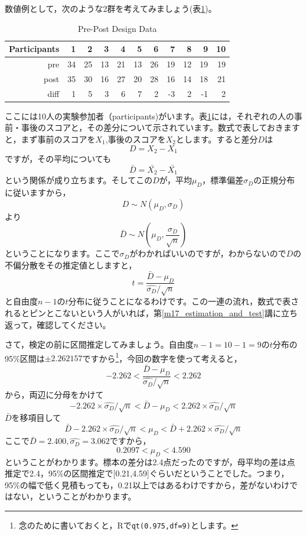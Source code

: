 \documentclass{ltjsbook}
\begin{document}
数値例として，次のような2群を考えてみましょう(表\ref{tbl19::01})。
\begin{table}[ht]
	\centering
	\caption{Pre-Post Design Data}
	\begin{tabular}{rrrrrrrrrrr}
		\hline
		Participants & 1  & 2  & 3  & 4  & 5  & 6  & 7  & 8  & 9  & 10 \\
		\hline
		pre          & 34 & 25 & 13 & 21 & 13 & 26 & 19 & 12 & 19 & 19 \\
		post         & 35 & 30 & 16 & 27 & 20 & 28 & 16 & 14 & 18 & 21 \\ \hline
		diff         & 1  & 5  & 3  & 6  & 7  & 2  & -3 & 2  & -1 & 2  \\
		\hline
	\end{tabular}
	\label{tbl19::01}
\end{table}
ここには10人の実験参加者（participants)がいます。表\ref{tbl19::01}には，それぞれの人の事前・事後のスコアと，その差分について示されています。数式で表しておきますと，まず事前のスコアを$X_1$,事後のスコアを$X_2$とします。すると差分$D$は
\[ D = X_2 - X_1 \]
ですが，その平均についても
\[ \bar{D} = \bar{X_2} - \bar{X_1} \]
という関係が成り立ちます。そしてこの$D$が，平均$\mu_D$，標準偏差$\sigma_D$の正規分布に従いますから，
\[ D \sim N(\mu_D,\sigma_D)\]
より
\[ \bar{D} \sim N(\mu_D,\frac{\sigma_D}{\sqrt{n}}) \]
ということになります。ここで$\sigma_D$がわかればいいのですが，わからないので$D$の不偏分散をその推定値としますと，
\[ t = \frac{\bar{D}-\mu_D}{\hat{\sigma_D}/\sqrt{n}} \]
と自由度$n-1$の$t$分布に従うことになるわけです。この一連の流れ，数式で表されるとピンとこないという人がいれば，第\ref{m17_estimation_and_test}講に立ち返って，確認してください。

さて，検定の前に区間推定してみましょう。自由度$n-1=10-1=9$の$t$分布の95\%区間は$\pm 2.262157$ですから\footnote{念のために書いておくと，Rで\texttt{qt(0.975,df=9)}とします。}，今回の数字を使って考えると，
\[ -2.262 < \frac{\bar{D}-\mu_D}{\hat{\sigma_D}/\sqrt{n}} < 2.262 \]
から，両辺に分母をかけて
\[ -2.262 \times \hat{\sigma_D}/\sqrt{n} < \bar{D}-\mu_D < 2.262 \times \hat{\sigma_D}/\sqrt{n} \]
$\bar{D}$を移項目して
\[ \bar{D}-2.262 \times \hat{\sigma_D}/\sqrt{n} < \mu_D < \bar{D}+2.262\times \hat{\sigma_D}/\sqrt{n} \]
ここで$\bar{D} = 2.400,\hat{\sigma_D} = 3.062$ですから，
\[ 0.2097 < \mu_D < 4.590 \]
ということがわかります。標本の差分は2.4点だったのですが，母平均の差は点推定で2.4，95\%の区間推定で[0.21,4.59]ぐらいだということでした。つまり，95\%の幅で低く見積もっても，0.21以上ではあるわけですから，差がないわけではない，ということがわかります。
\end{document}
